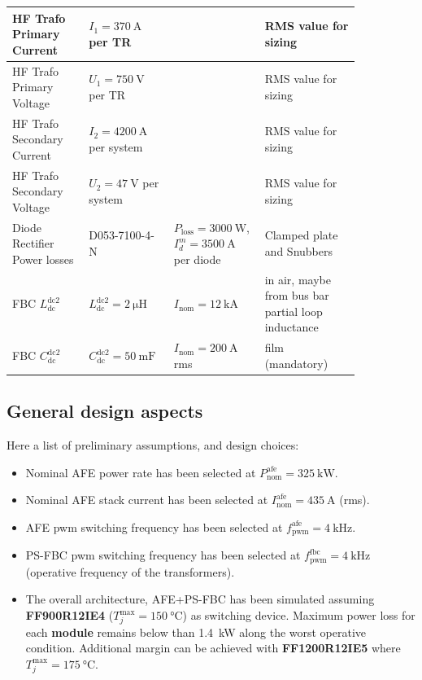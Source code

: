 \documentclass[11pt,a4paper]{scrartcl}
\begin{document}
\begin{onehalfspace}
\begin{center}
\begin{longtable}{p{0.2\linewidth}|p{0.2\linewidth}|p{0.2\linewidth}|p{0.25\linewidth}}
		\midrule
		HF Trafo Primary Current & $I_1 = \SI{370}{\ampere}$ per TR &  & RMS value for sizing  \\		
		\midrule
		HF Trafo Primary Voltage & $U_1 = \SI{750}{\volt}$ per TR &  &  RMS value for sizing \\		
		\midrule
		HF Trafo Secondary Current & $I_2 = \SI{4200}{\ampere}$ per system &  & RMS value for sizing \\
		\midrule
		HF Trafo Secondary Voltage & $U_2 = \SI{47}{\volt}$ per system &  & RMS value for sizing \\
		\midrule
		Diode Rectifier Power losses & D053-7100-4-N &   $P_\text{loss} =  \SI{3000}{\watt}$, $I_d^m = \SI{3500}{\ampere}$ per diode & Clamped plate and Snubbers \\
		\midrule
		FBC $L_\text{dc}^\text{dc2}$ & $L_\text{dc}^\text{dc2} = \SI{2}{\micro\henry}$ & $I_\text{nom} = \SI{12}{\kilo\ampere}$ & in air, maybe from bus bar partial loop inductance \\
		\midrule
		FBC $C_\text{dc}^\text{dc2}$ & $C_\text{dc}^\text{dc2} = \SI{50}{\milli\farad}$ & $I_\text{nom} = \SI{200}{\ampere}$ rms & film (mandatory) \\
		\bottomrule
	\end{longtable}
\end{center}

\subsection{General design aspects}
Here a list of preliminary assumptions, and design choices:
\begin{itemize}
	\item[--] Nominal AFE power rate has been selected at $P_\text{nom}^\text{afe} = \SI{325}{\kilo\watt}$.
	\item[--] Nominal AFE stack current has been selected at $I_\text{nom}^\text{afe} = \SI{435}{\ampere}$ (rms).
	\item[--] AFE pwm switching frequency has been selected at $f_\text{pwm}^\text{afe} = \SI{4}{\kilo\hertz}$.
	\item[--] PS-FBC pwm switching frequency has been selected at $f_\text{pwm}^\text{fbc} = \SI{4}{\kilo\hertz}$ (operative frequency of the transformers).
	\item[--] The overall architecture, AFE+PS-FBC has been simulated assuming \textbf{FF900R12IE4} ($T_j^\text{max} = \SI{150}{\celsius}$) as switching device. Maximum power loss for each \textbf{module} remains below than \SI{1.4}{\kilo\watt} along the worst operative condition. Additional margin can be achieved with \textbf{FF1200R12IE5} where $T_j^\text{max} = \SI{175}{\celsius}$.
\end{itemize}


\end{onehalfspace}
\end{document}
